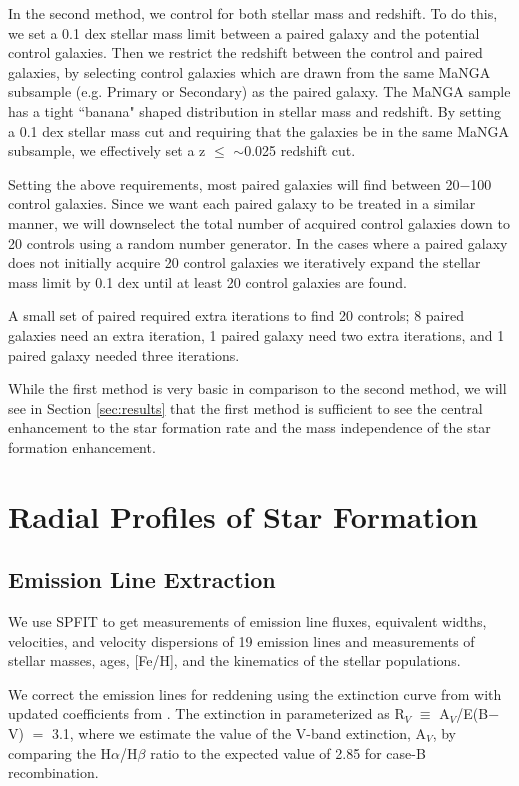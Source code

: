 \documentclass[iop,revtex4,twocolumn,apj,numberedappendix,appendixfloats]{emulateapj}
\begin{document}
In the second method, we control for both stellar mass and redshift. To do this, we set a 0.1 dex stellar mass limit between a paired galaxy and the potential control galaxies. Then we restrict the redshift between the control and paired galaxies, by selecting control galaxies which are drawn from the same MaNGA subsample (e.g. Primary or Secondary) as the paired galaxy. The MaNGA sample has a tight ``banana" shaped distribution in stellar mass and redshift. By setting a 0.1 dex stellar mass cut and requiring that the galaxies be in the same MaNGA subsample, we effectively set a z $\le$ $\sim$0.025 redshift cut. 

Setting the above requirements, most paired galaxies will find between 20$-$100 control galaxies. Since we want each paired galaxy to be treated in a similar manner, we will downselect the total number of acquired control galaxies down to 20 controls using a random number generator. In the cases where a paired galaxy does not initially acquire 20 control galaxies we iteratively expand the stellar mass limit by 0.1 dex until at least 20 control galaxies are found. 

A small set of paired required extra iterations to find 20 controls; 8 paired galaxies need an extra iteration, 1 paired galaxy need two extra iterations, and 1 paired galaxy needed three iterations.

While the first method is very basic in comparison to the second method, we will see in Section \ref{sec:results} that the first method is sufficient to see the central enhancement to the star formation rate and the mass independence of the star formation enhancement.

\section{Radial Profiles of Star Formation}\label{sec:analysis}

\subsection{Emission Line Extraction}

We use {\sc SPFIT} to get measurements of emission line fluxes, equivalent widths, velocities, and velocity dispersions of 19 emission lines and measurements of stellar masses, ages, [Fe/H], and the kinematics of the stellar populations. 

We correct the emission lines for reddening using the extinction curve from \citet{Cardelli:1989} with updated coefficients from \citet{ODonnell:1994}. The extinction in parameterized as R$_V$ $\equiv$ A$_V$/E(B$-$V) $=$ 3.1, where we estimate the value of the V-band extinction, A$_V$, by comparing the H$\alpha$/H$\beta$ ratio to the expected value of 2.85 for case-B recombination. 
\end{document}
